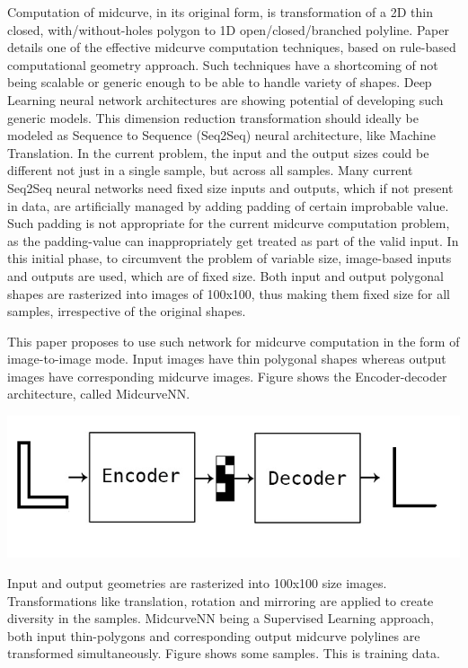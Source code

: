 \documentclass[10pt,twocolumn,letterpaper]{article}
\begin{document}
Computation of midcurve, in its original form, is transformation of a 2D thin closed, with/without-holes polygon to 1D open/closed/branched polyline. Paper \cite{dimred2017} details one of the effective midcurve computation techniques, based on rule-based computational geometry approach. Such techniques have a shortcoming of not being scalable or generic enough to be able to handle variety of shapes. Deep Learning neural network architectures are showing potential of developing such generic models. This dimension reduction transformation should ideally be modeled as Sequence to Sequence (Seq2Seq) neural architecture, like Machine Translation. In the current problem, the input and the output sizes could be different not just in a single sample, but across all samples. Many current Seq2Seq neural networks need fixed size inputs and outputs, which if not present in data, are artificially managed by adding padding of certain improbable value. Such padding is not appropriate for the current midcurve computation problem, as the padding-value can inappropriately get treated as part of the valid input. In this initial phase, to circumvent the problem of variable size, image-based inputs and outputs are used, which are of fixed size. Both input and output polygonal shapes are rasterized into images of 100x100, thus making them fixed size for all samples, irrespective of the original shapes.

This paper proposes to use such network for midcurve computation in the form of image-to-image mode. Input images have thin polygonal shapes whereas output images have corresponding midcurve images. Figure \cite{fig_endecoder} shows the Encoder-decoder architecture, called MidcurveNN.

     \begin{center}
	\includegraphics[width=0.8\linewidth]{images/midcurve_encoder_decoder}
	\label{fig_endecoder}
    \end{center}
    
Input and output geometries are rasterized into 100x100 size images. Transformations like translation, rotation and mirroring are applied to create diversity in the samples. MidcurveNN being a Supervised Learning approach, both input thin-polygons and corresponding output midcurve polylines are transformed simultaneously. Figure \cite{fig_training} shows some samples. This is training data.    
\end{document}
